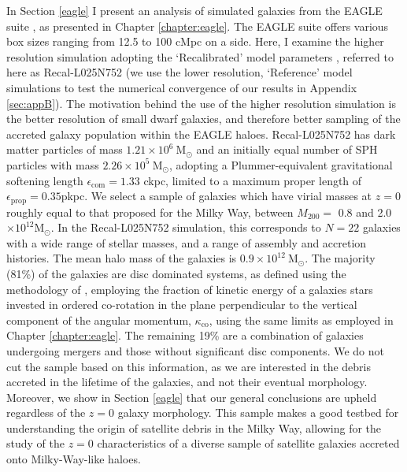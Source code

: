 In Section \ref{eagle} I present an analysis of simulated
galaxies from the EAGLE suite
\citep{2015MNRAS.446..521S,2015MNRAS.450.1937C}, as presented in Chapter \ref{chapter:eagle}.  The EAGLE suite offers various box sizes ranging from 12.5 to 100 cMpc on a side. Here, I examine the higher resolution simulation
adopting the `Recalibrated' model parameters
\citep[see][]{2015MNRAS.446..521S}, referred to here as Recal-L025N752
(we use the lower resolution, `Reference' model simulations to test
the numerical convergence of our results in Appendix \ref{sec:appB}).
The motivation behind the use of the higher resolution simulation
is the better resolution of small dwarf galaxies, and therefore
better sampling of the accreted galaxy population within the EAGLE
haloes. Recal-L025N752 has dark matter particles of mass $1.21\times
10^{6}\ \mathrm{M_{\odot}}$ and an initially equal number of SPH
particles with mass $2.26\times 10^{5}\ \mathrm{M_{\odot}}$, adopting
a Plummer-equivalent gravitational softening length
$\epsilon_\mathrm{com}=1.33$ ckpc, limited to a maximum proper
length of $\epsilon_\mathrm{prop}=0.35$pkpc. We select a sample of
galaxies which have virial masses at $z=0$ roughly equal
to that proposed for the Milky Way, between $M_{200} = $ 0.8 and
2.0 $ \times 10^{12}\mathrm{M_{\odot}}$.
In the Recal-L025N752 simulation, this corresponds to $N=22$ galaxies
with a wide range of stellar masses, and a range of assembly and
accretion histories.  The mean halo mass of the galaxies is
$0.9\times10^{12}\ \mathrm{M_\odot}$.  The majority (81\%) of the
galaxies are disc dominated systems, as defined using the methodology
of \citet{2017arXiv170406283C}, employing the fraction of
kinetic energy of a galaxies stars invested in ordered co-rotation
in the plane perpendicular to the vertical component of
the angular momentum, $\kappa_{\mathrm{co}}$, using the same limits as employed in Chapter \ref{chapter:eagle}.
The remaining 19\% are a combination of galaxies undergoing mergers
and those without significant disc components. We do not cut the
sample based on this information, as we are interested in the debris
accreted in the lifetime of the galaxies, and not their eventual
morphology. Moreover, we show in Section \ref{eagle} that
our general conclusions are upheld regardless of the $z=0$ galaxy
morphology.  This sample makes a good testbed for understanding the
origin of satellite debris in the Milky Way, allowing for the study of
the $z=0$ characteristics of a diverse sample of satellite galaxies
accreted onto Milky-Way-like haloes.

